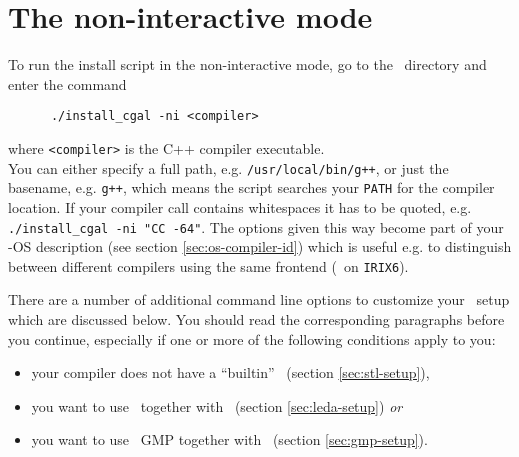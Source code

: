 
\section{The non-interactive mode \label{sec:non-interactive}}

To run the install script in the non-interactive mode, go to the
\cgaldir\ directory and enter the command
\begin{verbatim}
      ./install_cgal -ni <compiler>
\end{verbatim}
where \texttt{<compiler>} is the C++ compiler executable.\\
You can either specify a full path, e.g. \texttt{/usr/local/bin/g++},
or just the basename, e.g. \texttt{g++}, which means the script
searches your \texttt{PATH} for the compiler location. If your
compiler call contains whitespaces it has to be quoted, e.g.
\texttt{./install\_cgal -ni "CC -64"}.  The options given this way
become part of your \cgal-OS description (see section
\ref{sec:os-compiler-id}) which is useful e.g. to distinguish between
different compilers using the same frontend (\mipsprocc\ on
\texttt{IRIX6}).

There are a number of additional command line options to customize
your \cgal\ setup which are discussed below. You should read the
corresponding paragraphs before you continue, especially if one or
more of the following conditions apply to you:
\begin{itemize}
\item your compiler does not have a ``builtin'' \stl\ (section
  \ref{sec:stl-setup}),
\item you want to use \leda\ together with \cgal\ (section
  \ref{sec:leda-setup}) \textit{or}
\item you want to use \gnu\ GMP together with \cgal\ (section
  \ref{sec:gmp-setup}).
\end{itemize}

